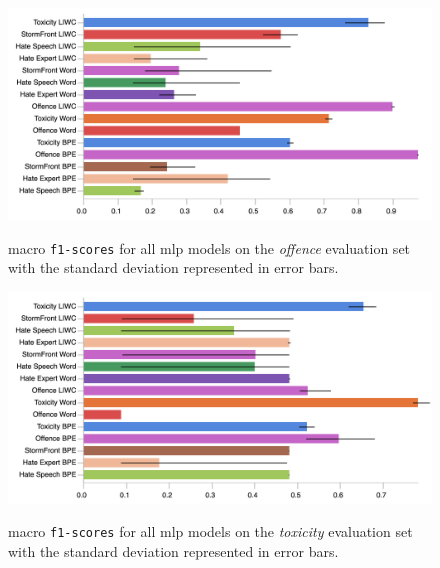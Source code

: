 \begin{figure}
\begin{minipage}{\textwidth}
    \centering
    \includegraphics[width=\textwidth]{all_mlp_davidson_test.pdf}
    \caption{macro \texttt{f1-scores} for all mlp models on the \textit{offence} evaluation set with the standard deviation represented in error bars.}
    \label{fig:davidson_mlp_test}
  \vfill
    \includegraphics[width=\textwidth]{all_mlp_wulczyn_test.pdf}
    \caption{macro \texttt{f1-scores} for all mlp models on the \textit{toxicity} evaluation set with the standard deviation represented in error bars.}
    \label{fig:wulczyn_mlp_test}
\end{minipage}
\end{figure}

